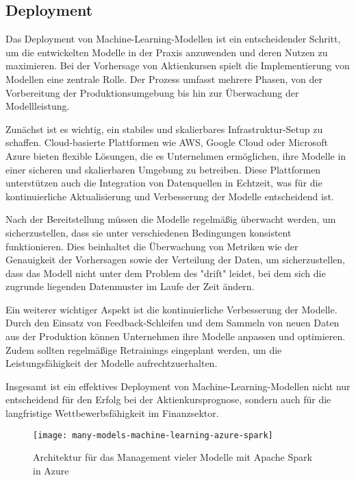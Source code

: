 \newpage
\subsection{Deployment}\label{sec:modellierung}

Das Deployment von Machine-Learning-Modellen ist ein entscheidender Schritt, um die entwickelten Modelle in der Praxis anzuwenden und deren Nutzen zu maximieren. Bei der Vorhersage von Aktienkursen spielt die Implementierung von Modellen eine zentrale Rolle. Der Prozess umfasst mehrere Phasen, von der Vorbereitung der Produktionsumgebung bis hin zur Überwachung der Modellleistung.

Zunächst ist es wichtig, ein stabiles und skalierbares Infrastruktur-Setup zu schaffen. Cloud-basierte Plattformen wie AWS, Google Cloud oder Microsoft Azure bieten flexible Lösungen, die es Unternehmen ermöglichen, ihre Modelle in einer sicheren und skalierbaren Umgebung zu betreiben. Diese Plattformen unterstützen auch die Integration von Datenquellen in Echtzeit, was für die kontinuierliche Aktualisierung und Verbesserung der Modelle entscheidend ist.

Nach der Bereitstellung müssen die Modelle regelmäßig überwacht werden, um sicherzustellen, dass sie unter verschiedenen Bedingungen konsistent funktionieren. Dies beinhaltet die Überwachung von Metriken wie der Genauigkeit der Vorhersagen sowie der Verteilung der Daten, um sicherzustellen, dass das Modell nicht unter dem Problem des "drift" leidet, bei dem sich die zugrunde liegenden Datenmuster im Laufe der Zeit ändern.

Ein weiterer wichtiger Aspekt ist die kontinuierliche Verbesserung der Modelle. Durch den Einsatz von Feedback-Schleifen und dem Sammeln von neuen Daten aus der Produktion können Unternehmen ihre Modelle anpassen und optimieren. Zudem sollten regelmäßige Retrainings eingeplant werden, um die Leistungsfähigkeit der Modelle aufrechtzuerhalten.

Insgesamt ist ein effektives Deployment von Machine-Learning-Modellen nicht nur entscheidend für den Erfolg bei der Aktienkursprognose, sondern auch für die langfristige Wettbewerbsfähigkeit im Finanzsektor.

\begin{figure}[h]
	\centering
	\texttt{[image: many-models-machine-learning-azure-spark]}
	\caption{Architektur für das Management vieler Modelle mit Apache Spark in Azure}
	\label{fig:ml_deployment_architecture}
\end{figure}

\autocite{mason2018machine}
\autocite{chen2019model}
\autocite{microsoft2020}







